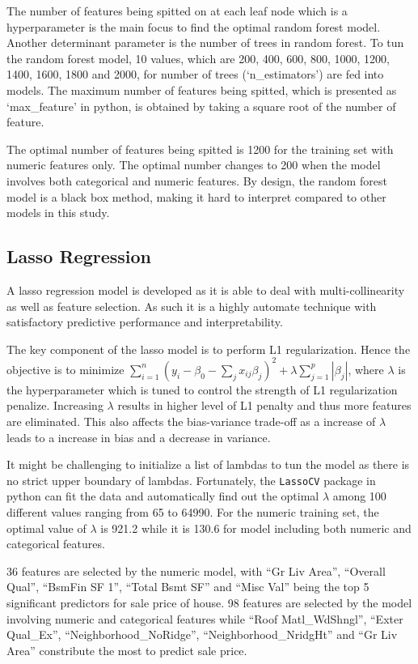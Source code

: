 \documentclass[letterpaper,12pt,twoside,]{pinp}
\begin{document}
The number of features being spitted on at each leaf node which is a
hyperparameter is the main focus to find the optimal random forest
model. Another determinant parameter is the number of trees in random
forest. To tun the random forest model, 10 values, which are 200, 400,
600, 800, 1000, 1200, 1400, 1600, 1800 and 2000, for number of trees
(`n\_estimators') are fed into models. The maximum number of features
being spitted, which is presented as `max\_feature' in python, is
obtained by taking a square root of the number of feature.

The optimal number of features being spitted is 1200 for the training
set with numeric features only. The optimal number changes to 200 when
the model involves both categorical and numeric features. By design, the
random forest model is a black box method, making it hard to interpret
compared to other models in this study.

\hypertarget{lasso-regression}{%
\subsection{Lasso Regression}\label{lasso-regression}}

A lasso regression model is developed as it is able to deal with
multi-collinearity as well as feature selection. As such it is a highly
automate technique with satisfactory predictive performance and
interpretability.

The key component of the lasso model is to perform L1 regularization.
Hence the objective is to minimize
\(\sum^n_{i=1}(y_i-\beta_0-\sum_jx_{ij}\beta_j)^2+\lambda\sum^p_{j=1}|\beta_j|\),
where \(\lambda\) is the hyperparameter which is tuned to control the
strength of L1 regularization penalize. Increasing \(\lambda\) results
in higher level of L1 penalty and thus more features are eliminated.
This also affects the bias-variance trade-off as a increase of
\(\lambda\) leads to a increase in bias and a decrease in variance.

It might be challenging to initialize a list of lambdas to tun the model
as there is no strict upper boundary of lambdas. Fortunately, the
\texttt{LassoCV} package in python can fit the data and automatically
find out the optimal \(\lambda\) among 100 different values ranging from
65 to 64990. For the numeric training set, the optimal value of
\(\lambda\) is 921.2 while it is 130.6 for model including both numeric
and categorical features.

36 features are selected by the numeric model, with ``Gr Liv Area'',
``Overall Qual'', ``BsmFin SF 1'', ``Total Bsmt SF'' and ``Misc Val''
being the top 5 significant predictors for sale price of house. 98
features are selected by the model involving numeric and categorical
features while ``Roof Matl\_WdShngl'', ``Exter Qual\_Ex'',
``Neighborhood\_NoRidge'', ``Neighborhood\_NridgHt'' and ``Gr Liv Area''
constribute the most to predict sale price.
\end{document}
